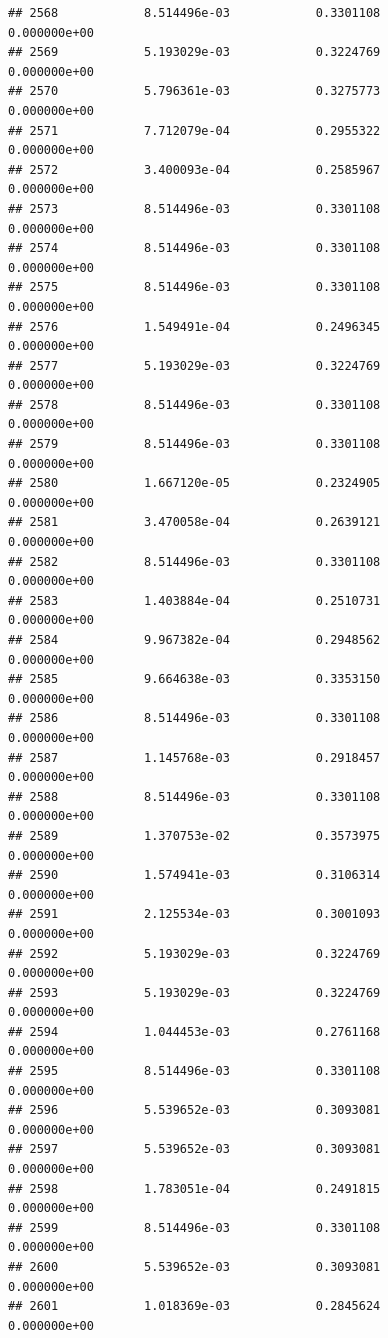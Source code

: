 \documentclass[
]{article}
\begin{document}
\begin{verbatim}
## 2568            8.514496e-03            0.3301108            0.000000e+00
## 2569            5.193029e-03            0.3224769            0.000000e+00
## 2570            5.796361e-03            0.3275773            0.000000e+00
## 2571            7.712079e-04            0.2955322            0.000000e+00
## 2572            3.400093e-04            0.2585967            0.000000e+00
## 2573            8.514496e-03            0.3301108            0.000000e+00
## 2574            8.514496e-03            0.3301108            0.000000e+00
## 2575            8.514496e-03            0.3301108            0.000000e+00
## 2576            1.549491e-04            0.2496345            0.000000e+00
## 2577            5.193029e-03            0.3224769            0.000000e+00
## 2578            8.514496e-03            0.3301108            0.000000e+00
## 2579            8.514496e-03            0.3301108            0.000000e+00
## 2580            1.667120e-05            0.2324905            0.000000e+00
## 2581            3.470058e-04            0.2639121            0.000000e+00
## 2582            8.514496e-03            0.3301108            0.000000e+00
## 2583            1.403884e-04            0.2510731            0.000000e+00
## 2584            9.967382e-04            0.2948562            0.000000e+00
## 2585            9.664638e-03            0.3353150            0.000000e+00
## 2586            8.514496e-03            0.3301108            0.000000e+00
## 2587            1.145768e-03            0.2918457            0.000000e+00
## 2588            8.514496e-03            0.3301108            0.000000e+00
## 2589            1.370753e-02            0.3573975            0.000000e+00
## 2590            1.574941e-03            0.3106314            0.000000e+00
## 2591            2.125534e-03            0.3001093            0.000000e+00
## 2592            5.193029e-03            0.3224769            0.000000e+00
## 2593            5.193029e-03            0.3224769            0.000000e+00
## 2594            1.044453e-03            0.2761168            0.000000e+00
## 2595            8.514496e-03            0.3301108            0.000000e+00
## 2596            5.539652e-03            0.3093081            0.000000e+00
## 2597            5.539652e-03            0.3093081            0.000000e+00
## 2598            1.783051e-04            0.2491815            0.000000e+00
## 2599            8.514496e-03            0.3301108            0.000000e+00
## 2600            5.539652e-03            0.3093081            0.000000e+00
## 2601            1.018369e-03            0.2845624            0.000000e+00

\end{verbatim}
\end{document}
